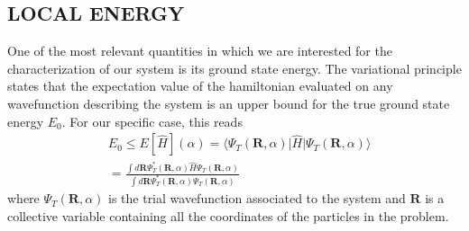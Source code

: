 \subsection{LOCAL ENERGY}
One of the most relevant quantities in which we are interested for the characterization of our system is its ground state energy. The variational principle states that the expectation value of the hamiltonian evaluated on any wavefunction describing the system is an upper bound for the true ground state energy $E_0$. For our specific case, this reads 
\begin{align*}
    &E_0 \leq E [ \hat{H} ](\alpha) = \langle \Psi_T(\bm{R}, \alpha) \vert \hat{H} \vert \Psi_T(\bm{R}, \alpha) \rangle \\
    &= \frac{\int d\bm{R} \Psi_T^*(\bm{R}, \alpha) \hat{H} \Psi_T(\bm{R}, \alpha) }{\int d\bm{R} \Psi_T^*(\bm{R}, \alpha) \Psi_T(\bm{R}, \alpha)}
\end{align*}
where $\Psi_T(\bm{R},\alpha)$ is the trial wavefunction associated to the system and $\bm{R}$ is a collective variable containing all the coordinates of the particles in the problem. 

